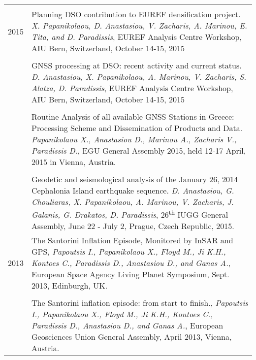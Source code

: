 \documentclass[9pt]{extarticle} %
\begin{document}
\begin{longtable}{r|p{14cm}}
\multicolumn{2}{c}{} \\ 
  \textsc{2015}

  & Planning DSO contribution to EUREF densification project.
  \emph{X. Papanikolaou, D. Anastasiou, V. Zacharis, A. Marinou, E. Tita, and D. Paradissis},
  EUREF Analysis Centre Workshop, AIU Bern, Switzerland, October 14-15, 2015\\

  &\\

  & GNSS processing at DSO: recent activity and current status.
  \emph{D. Anastasiou, X. Papanikolaou, A. Marinou, V. Zacharis, S. Alatza, D. Paradissis},
  EUREF Analysis Centre Workshop, AIU Bern, Switzerland, October 14-15, 2015\\

  &\\

  & Routine Analysis of all available GNSS Stations in Greece: Processing Scheme and Dissemination of Products and Data.
  \emph{Papanikolaou X., Anastasiou D., Marinou A., Zacharis V., Paradissis D.},
  EGU General Assembly 2015, held 12-17 April, 2015 in Vienna, Austria.\\

  &\\

  & Geodetic and seismological analysis of the January 26, 2014 Cephalonia Island earthquake sequence.
  \emph{D. Anastasiou, G. Chouliaras, X. Papanikolaou, A. Marinou, V. Zacharis, J. Galanis, G. Drakatos, D. Paradissis},
  26\textsuperscript{th} IUGG General Assembly, June 22 - July 2, Prague, Czech Republic, 2015.\\
  
  \textsc{2013}
  & The Santorini Inflation Episode, Monitored by InSAR and GPS,
  \emph{Papoutsis I., Papanikolaou X., Floyd M., Ji K.H., Kontoes C., Paradissis D., Anastasiou D., and Ganas A.},
  European Space Agency Living Planet Symposium, Sept. 2013, Edinburgh, UK.\\

  &\\

  & The Santorini inflation episode: from start to finish.,
  \emph{Papoutsis I., Papanikolaou X., Floyd M., Ji K.H., Kontoes C., Paradissis D., Anastasiou D., and Ganas A.},
  European Geosciences Union General Assembly, April 2013, Vienna, Austria.\\


\end{longtable}
\end{document}
